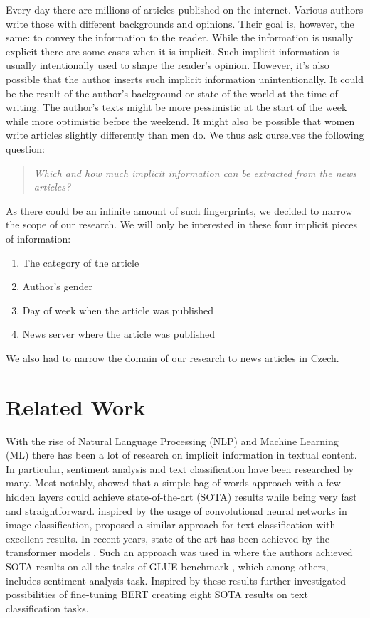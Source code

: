 Every day there are millions of articles published on the internet. Various authors write those
with different backgrounds and opinions. Their goal is, however, the same: to convey the information to the reader.
While the information is usually explicit there are some cases when it is implicit. Such implicit information 
is usually intentionally used to shape the reader's opinion. However, it's also possible
that the author inserts such implicit information unintentionally. It could
be the result of the author's background or state of the world at the time of writing.
The author's texts might be more pessimistic at the start of the week while more optimistic before the weekend.
It might also be possible that women write articles slightly differently than men do.
We thus ask ourselves the following question:
\begin{quote}
    \textit{Which and how much implicit information can be extracted from the news articles?}
\end{quote}

As there could be an infinite amount of such fingerprints, we decided to narrow the scope of our research.
We will only be interested in these four implicit pieces of information:
\begin{enumerate}
    \item The category of the article
    \item Author's gender
    \item Day of week when the article was published
    \item News server where the article was published
\end{enumerate}
We also had to narrow the domain of our research to news articles in Czech.


\section*{Related Work}
With the rise of Natural Language Processing (NLP) and Machine Learning (ML)
there has been a lot of research on implicit information in textual content.
In particular, sentiment analysis and text classification have been researched by many.
Most notably, \cite{joulinBagTricksEfficient2016} showed that a simple bag of words approach
with a few hidden layers could achieve state-of-the-art (SOTA) results while being very fast and straightforward.
\cite{zhangTextUnderstandingScratch2016} inspired by the usage of convolutional neural networks in image classification,
proposed a similar approach for text classification with excellent results.
In recent years, state-of-the-art has been achieved by the transformer models \cite{vaswaniAttentionAllYou2017d}.
Such an approach was used in \cite{devlinBERTPretrainingDeep2019a} where the authors achieved SOTA results on
all the tasks of GLUE benchmark \cite{wangGLUEMultiTaskBenchmark2019}, which among others, includes 
sentiment analysis task. Inspired by these results \cite{sunHowFineTuneBERT2020} further investigated possibilities
of fine-tuning BERT creating eight SOTA results on text classification tasks.

